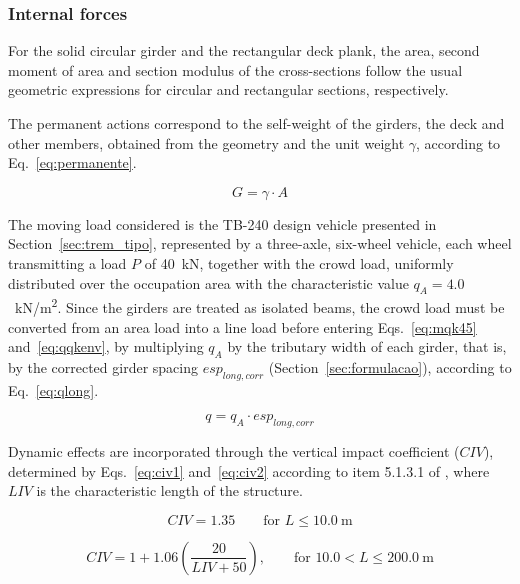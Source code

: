 \subsubsection{Internal forces}

For the solid circular girder and the rectangular deck plank, the area, second moment of area and section modulus of the cross-sections follow the usual geometric expressions for circular and rectangular sections, respectively.

The permanent actions correspond to the self-weight of the girders, the deck and other members, obtained from the geometry and the unit weight $\gamma$, according to Eq.~\eqref{eq:permanente}.

\begin{equation}
G = \gamma \cdot A
\label{eq:permanente}
\end{equation}

The moving load considered is the TB-240 design vehicle presented in Section~\ref{sec:trem_tipo}, represented by a three-axle, six-wheel vehicle, each wheel transmitting a load $P$ of 40~kN, together with the crowd load, uniformly distributed over the occupation area with the characteristic value $q_A = 4.0$~kN/m\textsuperscript{2}.
Since the girders are treated as isolated beams, the crowd load must be converted from an area load into a line load before entering Eqs.~\eqref{eq:mqk45} and~\eqref{eq:qqkenv}, by multiplying $q_A$ by the tributary width of each girder, that is, by the corrected girder spacing $esp_{long,corr}$ (Section~\ref{sec:formulacao}), according to Eq.~\eqref{eq:qlong}.

\begin{equation}
q = q_A \cdot esp_{long,corr}
\label{eq:qlong}
\end{equation}

Dynamic effects are incorporated through the vertical impact coefficient ($CIV$), determined by Eqs.~\eqref{eq:civ1} and~\eqref{eq:civ2} according to item 5.1.3.1 of \textcite{nbr7188}, where $LIV$ is the characteristic length of the structure.

\begin{equation}
CIV = 1.35 \qquad \text{for } L \leq 10.0\ \text{m}
\label{eq:civ1}
\end{equation}

\begin{equation}
CIV = 1 + 1.06\left(\frac{20}{LIV + 50}\right), \qquad \text{for } 10.0 < L \leq 200.0\ \text{m}
\label{eq:civ2}
\end{equation}

